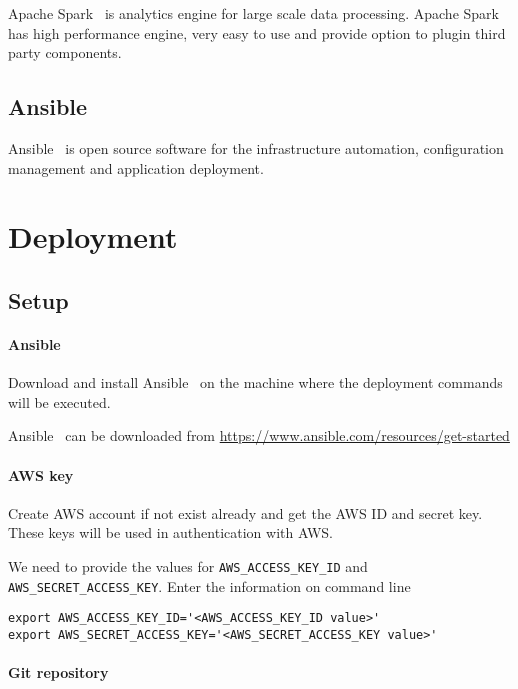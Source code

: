 Apache Spark~\cite{hid-sp18-511-www-spark} is analytics engine for
large scale data processing. Apache
Spark~\cite{hid-sp18-511-www-spark} has high performance engine, very
easy to use and provide option to plugin third party components.

\subsection{Ansible}

Ansible~\cite{hid-sp18-511-www-ansible} is open source software for
the infrastructure automation, configuration management and
application deployment.

\section{Deployment}

\subsection{Setup}

\paragraph{Ansible}
Download and install Ansible~\cite{hid-sp18-511-www-ansible} on the machine where the deployment commands will be executed.

Ansible~\cite{hid-sp18-511-www-ansible} can be downloaded from 
\url{https://www.ansible.com/resources/get-started}

\paragraph{AWS key}

Create AWS account if not exist already and get the AWS ID and secret key. These keys will be used in authentication with AWS.

We need to provide the values for \verb|AWS_ACCESS_KEY_ID|
and \verb|AWS_SECRET_ACCESS_KEY|. Enter the information on command line

\begin{verbatim}
export AWS_ACCESS_KEY_ID='<AWS_ACCESS_KEY_ID value>'
export AWS_SECRET_ACCESS_KEY='<AWS_SECRET_ACCESS_KEY value>'
\end{verbatim}

\paragraph{Git repository}

